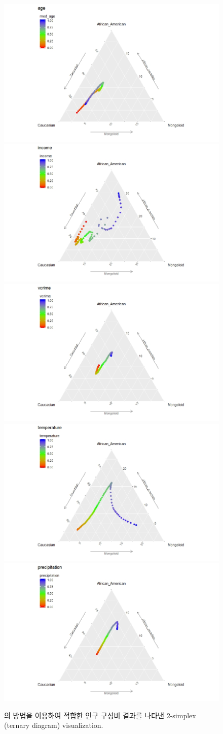 \begin{figure}[h!]
	\centering
	\includegraphics[width=0.48\linewidth]{figs/p_age.jpeg}
	\hspace{.005\linewidth} 
	\includegraphics[width=0.48\linewidth]{figs/p_income.jpeg}
	\\[.5\baselineskip]
	\includegraphics[width=0.48\linewidth]{figs/p_vcrime.jpeg}
	\hspace{.005\linewidth} 
	\includegraphics[width=0.48\linewidth]{figs/p_temperature.jpeg}
	\\[.5\baselineskip]
	\includegraphics[width=0.48\linewidth]{figs/p_precipitation.jpeg}
	\caption{\citet{jeon2018additive}의 방법을 이용하여 적합한 인구 구성비 결과를 나타낸 2-simplex (ternary diagram) visualization.}
\end{figure}


